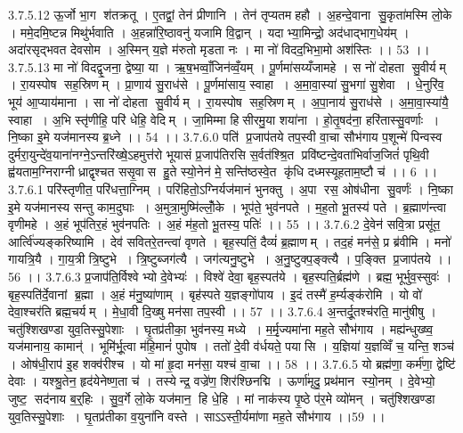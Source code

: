 3.7.5.12
ऊ॒र्जो भा॒ग श॑तक्रतू । ए॒तद्वां॒ तेन॑ प्रीणानि । तेन॑ तृप्यतमहहौ । अ॒हन्दे॒वाना॑ सु॒कृता॑मस्मि लो॒के । ममे॒दमि॒ष्टन्न मिथु॑र्भवाति । अ॒हन्ना॑रि॒ष्ठावनु॑ यजामि वि॒द्वान् । यदाभ्या॒मिन्द्रो॒ अद॑धाद्भाग॒धेय॑म् । अदा॑रसृद्भवत देवसोम । अ॒स्मिन् य॒ज्ञे म॑रुतो मृडता नः । मा नो॑ विदद॒भिभा॒मो अश॑स्तिः ।। 53 ।।
3.7.5.13
मा नो॑ विदद्वृ॒जना॒ द्वेष्या॒ या । ऋ॒ष॒भव्वाँ॒जिन॑व्वँ॒यम् । पू॒र्णमा॑सय्यँजामहे । स नो॑ दोहता सु॒वीर्यम् । रा॒यस्पोष॑ सह॒स्रिणम् । प्रा॒णाय॑ सु॒राध॑से । पू॒र्णमा॑साय॒ स्वाहा । अ॒मा॒वा॒स्या॑ सु॒भगा॑ सु॒शेवा । धे॒नुरि॑व॒ भूय॑ आ॒प्याय॑माना । सा नो॑ दोहता सु॒वीर्यम् । रा॒यस्पोष॑ सह॒स्रिणम् । अ॒पा॒नाय॑ सु॒राध॑से । अ॒मा॒वा॒स्या॑यै॒ स्वाहा । अ॒भि स्तृ॑णीहि॒ परि॑ धेहि॒ वेदिम् । जा॒मिम्मा हि॑सीरमु॒या शया॑ना । हो॒तृ॒षद॑ना॒ हरि॑तास्सु॒वर्णाः । नि॒ष्का इ॒मे यज॑मानस्य ब्र॒ध्ने ।। 54 ।।
3.7.6.0
पति॑ प्र॒जाप॑तये तप॒स्वी वा॒चा सौभ॑गाय प॒शून्मे॑ पिन्वस्व दुर्मरा॒युन्दे॑व॒याना॑नग्ने॒ऽन्तरि॑ख्षे॒ऽहमुत्त॑रो भूयासं प्र॒जाप॑तिरसि स॒र्वत॑श्श्रि॒त प्रवि॑ष्टन्दे॒वता॑भिर्वाज॒जितं॑ पृथि॒वी ह्व॑यताम॒ग्निराग्नीध्राद्वृश्चत ससृ॒वास॑ हु॒ते स्यो॒नेन॑ मे॒ सन्ति॑ष्ठस्वे॒त कृ॑धि दध्मस्यूहताम॒ष्टौ च॑ ।। 6 ।।
3.7.6.1
परि॑स्तृणीत॒ परि॑धत्ता॒ग्निम् । परि॑हितो॒ऽग्निर्यज॑मानं भुनक्तु । अ॒पा रस॒ ओष॑धीना सु॒वर्णः॑ । नि॒ष्का इ॒मे यज॑मानस्य सन्तु काम॒दुघाः । अ॒मुत्रा॒मुष्मि॑ल्लोँ॒के । भूप॑ते॒ भुव॑नपते । म॒ह॒तो भू॒तस्य॑ पते । ब्र॒ह्माण॑न्त्वा वृणीमहे । अ॒हं भूप॑तिर॒हं भुव॑नपतिः । अ॒हं म॑ह॒तो भू॒तस्य॒ पतिः॑ ।। 55 ।।
3.7.6.2
दे॒वेन॑ सवि॒त्रा प्रसू॑त॒ आर्त्वि॑ज्यङ्करिष्यामि । देव॑ सवितरे॒तन्त्वा॑ वृणते । बृह॒स्पतिं॒ दैव्यं॑ ब्र॒ह्माणम् । तद॒हं मन॑से॒ प्र ब्र॑वीमि । मनो॑ गायत्रि॒यै । गा॒य॒त्री त्रि॒ष्टुभे । त्रि॒ष्टुब्जग॑त्यै । जग॑त्यनु॒ष्टुभे । अ॒नु॒ष्टुक्प॒ङ्क्त्यै । प॒ङ्क्ति प्र॒जाप॑तये ।। 56 ।।
3.7.6.3
प्र॒जाप॑ति॒र्विश्वेभ्यो दे॒वेभ्यः॑ । विश्वे॑ देवा॒ बृह॒स्पत॑ये । बृह॒स्पति॒र्ब्रह्म॑णे । ब्रह्म॒ भूर्भुव॒स्सुवः॑ । बृह॒स्पति॑र्दे॒वानां ब्र॒ह्मा । अ॒हं म॑नु॒ष्या॑णाम् । बृह॑स्पते य॒ज्ञङ्गो॑पाय । इ॒दं तस्मै॑ ह॒र्म्यङ्क॑रोमि । यो वो॑ देवा॒श्चर॑ति ब्रह्म॒चर्यम् । मे॒धा॒वी दि॒ख्षु मन॑सा तप॒स्वी ।। 57 ।।
3.7.6.4
अ॒न्तर्दू॒तश्च॑रति॒ मानु॑षीषु । चतु॑श्शिखण्डा युव॒तिस्सु॒पेशाः । घृ॒तप्र॑तीका॒ भुव॑नस्य॒ मध्ये । म॒र्मृ॒ज्यमा॑ना मह॒ते सौभ॑गाय । मह्य॑न्धुख्ष्व॒ यज॑मानाय॒ कामान्॑ । भूमि॑र्भू॒त्वा म॑हि॒मानं॑ पुपोष । ततो॑ दे॒वी व॑र्धयते॒ पया॑सि । य॒ज्ञिया॑ य॒ज्ञव्विँ च॒ यन्ति॒ शञ्च॑ । ओष॑धी॒राप॑ इ॒ह शक्व॑रीश्च । यो मा॑ हृ॒दा मन॑सा॒ यश्च॑ वा॒चा ।। 58 ।।
3.7.6.5
यो ब्रह्म॑णा॒ कर्म॑णा॒ द्वेष्टि॑ देवाः । यश्श्रु॒तेन॒ हृद॑येनेष्ण॒ता च॑ । तस्येन्द्र॒ वज्रे॑ण॒ शिर॑श्छिनद्मि । ऊर्णा॑मृदु॒ प्रथ॑मान स्यो॒नम् । दे॒वेभ्यो॒ जुष्ट॒॒ सद॑नाय ब॒र्॒हिः । सु॒व॒र्गे लो॒के यज॑मान॒ हि धे॒हि । मां नाक॑स्य पृ॒ष्ठे प॑र॒मे व्यो॑मन् । चतु॑श्शिखण्डा युव॒तिस्सु॒पेशाः । घृ॒तप्र॑तीका व॒युना॑नि वस्ते । साऽऽस्ती॒र्यमा॑णा मह॒ते सौभ॑गाय ।।59 ।।
